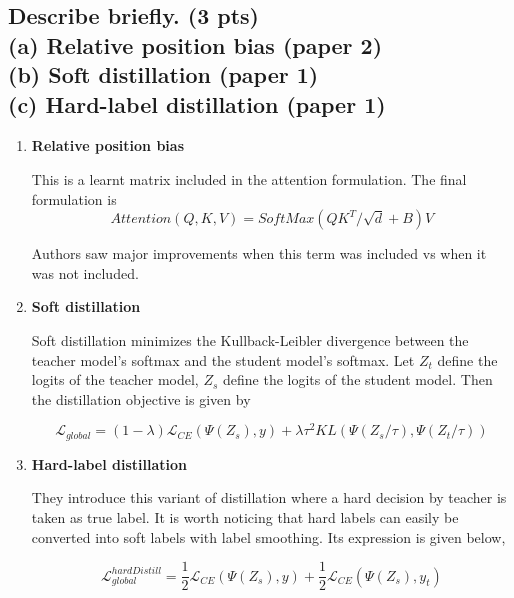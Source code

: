 \documentclass{article}
\begin{document}
\subsection{Describe briefly. (3 pts) \\ (a) Relative position bias (paper 2) \\ (b) Soft distillation (paper 1) \\ (c) Hard-label distillation (paper 1)}



\begin{enumerate}
    \item \textbf{Relative position bias}
    
    This is a learnt matrix included in the attention formulation. The final formulation is $$Attention(Q, K,V)=SoftMax(QK^T/\sqrt d+B)V$$ 
    
    Authors saw major improvements when this term was included vs when it was not included.
    
    \item \textbf{Soft distillation}
    
    Soft distillation minimizes the Kullback-Leibler divergence between the teacher model’s softmax and the student model’s softmax. Let $Z_t$ define the logits of the teacher model, $Z_s$  define the logits of the student model. Then the distillation objective is given by
    
    $$\mathcal L_{global}= (1-\lambda)\mathcal{L}_{CE}(\Psi(Z_s),y)+\lambda\tau^2KL(\Psi(Z_s/\tau), \Psi(Z_t/\tau))$$
    
    \item \textbf{Hard-label distillation}
    
    They introduce this variant of distillation where a hard decision by teacher is taken as true label.
    It is worth noticing that hard labels can easily be converted into soft labels with label smoothing. Its expression is given below,
    
    $$\mathcal L_{global}^{hardDistill}= \frac{1}{2}\mathcal{L}_{CE}(\Psi(Z_s),y)+\frac{1}{2}\mathcal{L}_{CE}(\Psi(Z_s),y_t)$$
\end{enumerate}


\begin{enumerate}
\end{enumerate}
\end{document}
